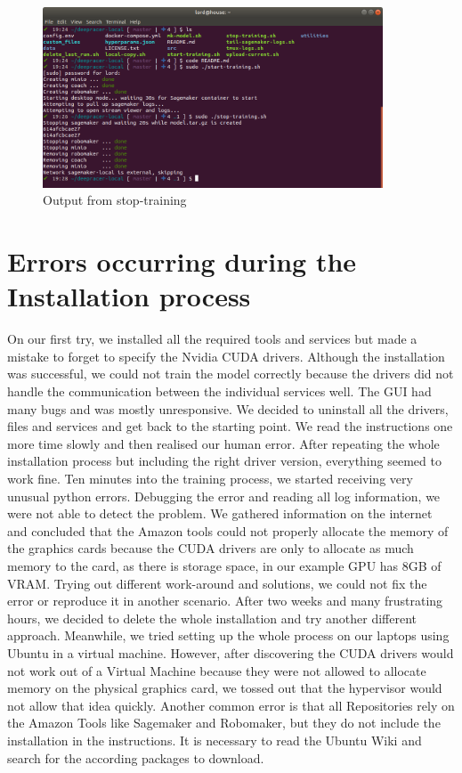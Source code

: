 \begin{figure}[H]
    \centering
    \includegraphics[width=0.9\textwidth]{images/deepracer_local_training_stop.png}
    \caption[]{Output from stop-training\footnotemark}
    \label{fig:console-output-stop}
\end{figure}

\section{Errors occurring during the Installation process}
On our first try, we installed all the required tools and services but made a mistake to forget to specify the Nvidia CUDA drivers. Although the installation was successful, we could not train the model correctly because the drivers did not handle the communication between the individual services well. The GUI had many bugs and was mostly unresponsive. We decided to uninstall all the drivers, files and services and get back to the starting point. We read the instructions one more time slowly and then realised our human error. After repeating the whole installation process but including the right driver version, everything seemed to work fine. Ten minutes into the training process, we started receiving very unusual python errors. Debugging the error and reading all log information, we were not able to detect the problem. We gathered information on the internet and concluded that the Amazon tools could not properly allocate the memory of the graphics cards because the CUDA drivers are only to allocate as much memory to the card, as there is storage space, in our example GPU has 8GB of VRAM. Trying out different work-around and solutions, we could not fix the error or reproduce it in another scenario. After two weeks and many frustrating hours, we decided to delete the whole installation and try another different approach. \newline Meanwhile, we tried setting up the whole process on our laptops using Ubuntu in a virtual machine. However, after discovering the CUDA drivers would not work out of a Virtual Machine because they were not allowed to allocate memory on the physical graphics card, we tossed out that the hypervisor would not allow that idea quickly. \newline Another common error is that all Repositories rely on the Amazon Tools like Sagemaker and Robomaker, but they do not include the installation in the instructions. It is necessary to read the Ubuntu Wiki and search for the according packages to download.


